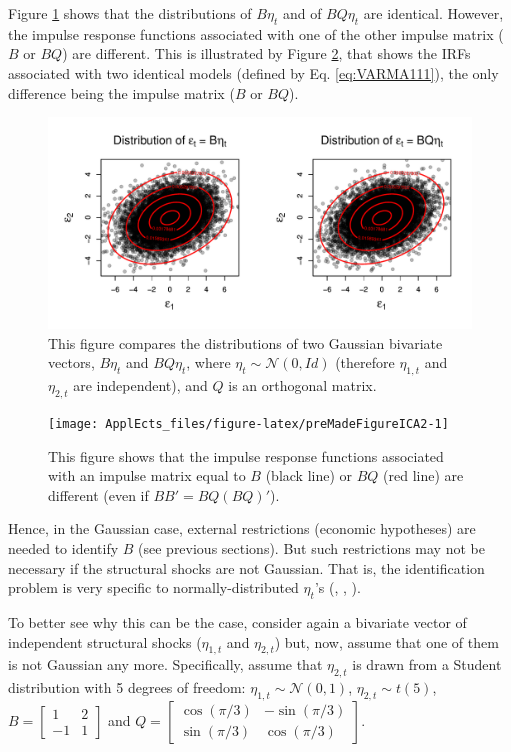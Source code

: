 \documentclass[
  12pt,
]{book}
\theoremstyle{definition}
\theoremstyle{definition}
\theoremstyle{definition}
\theoremstyle{definition}
\theoremstyle{remark}
\begin{document}
Figure \ref{fig:preMadeFigureICA} shows that the distributions of \(B \eta_t\) and of \(BQ\eta_t\) are identical. However, the impulse response functions associated with one of the other impulse matrix (\(B\) or \(BQ\)) are different. This is illustrated by Figure \ref{fig:preMadeFigureICA2}, that shows the IRFs associated with two identical models (defined by Eq. \eqref{eq:VARMA111}), the only difference being the impulse matrix (\(B\) or \(BQ\)).

\begin{figure}
\includegraphics[width=0.95\linewidth]{images/Figure_A} \caption{This figure compares the distributions of two Gaussian bivariate vectors, $B \eta_t$ and $BQ\eta_t$, where $\eta_{t} \sim \mathcal{N}(0,Id)$ (therefore $\eta_{1,t}$ and $\eta_{2,t}$ are independent), and $Q$  is an orthogonal matrix.}\label{fig:preMadeFigureICA}
\end{figure}

\begin{figure}
\texttt{[image: ApplEcts\_files/figure-latex/preMadeFigureICA2-1]} \caption{This figure shows that the impulse response functions associated with an impulse matrix equal to $B$ (black line) or $BQ$ (red line) are different (even if $BB'=BQ(BQ)'$).}\label{fig:preMadeFigureICA2}
\end{figure}

Hence, in the Gaussian case, external restrictions (economic hypotheses) are needed to identify \(B\) (see previous sections). But such restrictions may not be necessary if the structural shocks are not Gaussian. That is, the identification problem is very specific to normally-distributed \(\eta_t\)'s (\citet{Rigobon_2003}, \citet{NORMANDIN20041217}, \citet{Lanne_Lutkepohl_2008}).

To better see why this can be the case, consider again a bivariate vector of independent structural shocks (\(\eta_{1,t}\) and \(\eta_{2,t}\)) but, now, assume that one of them is not Gaussian any more. Specifically, assume that \(\eta_{2,t}\) is drawn from a Student distribution with 5 degrees of freedom:
\(\eta_{1,t} \sim \mathcal{N}(0,1)\), \(\eta_{2,t} \sim t(5)\),
\(B = \left[\begin{array}{cc} 1 & 2 \\ -1 & 1 \end{array}\right]\) and
\(Q = \left[\begin{array}{cc} \cos(\pi/3) & -\sin(\pi/3) \\ \sin(\pi/3) & \cos(\pi/3) \end{array}\right]\).
\end{document}
